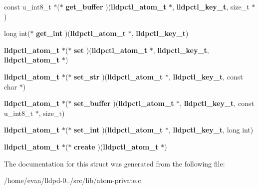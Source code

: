 \begin{DoxyCompactItemize}
\item 
const u\-\_\-int8\-\_\-t $\ast$($\ast$ {\bfseries get\-\_\-buffer} )({\bf lldpctl\-\_\-atom\-\_\-t} $\ast$, {\bf lldpctl\-\_\-key\-\_\-t}, size\-\_\-t $\ast$)\label{structatom__builder_ad81a05eb99677eeb9e5ac7226e34a9c6}

\item 
long int($\ast$ {\bfseries get\-\_\-int} )({\bf lldpctl\-\_\-atom\-\_\-t} $\ast$, {\bf lldpctl\-\_\-key\-\_\-t})\label{structatom__builder_a6daa5d14018b2226425d675867e40bd7}

\item 
{\bf lldpctl\-\_\-atom\-\_\-t} $\ast$($\ast$ {\bfseries set} )({\bf lldpctl\-\_\-atom\-\_\-t} $\ast$, {\bf lldpctl\-\_\-key\-\_\-t}, {\bf lldpctl\-\_\-atom\-\_\-t} $\ast$)\label{structatom__builder_afe734b0f5f76782c6236dc0fd895f515}

\item 
{\bf lldpctl\-\_\-atom\-\_\-t} $\ast$($\ast$ {\bfseries set\-\_\-str} )({\bf lldpctl\-\_\-atom\-\_\-t} $\ast$, {\bf lldpctl\-\_\-key\-\_\-t}, const char $\ast$)\label{structatom__builder_a6dd98361f1f4ea8433ee9b2d752db187}

\item 
{\bf lldpctl\-\_\-atom\-\_\-t} $\ast$($\ast$ {\bfseries set\-\_\-buffer} )({\bf lldpctl\-\_\-atom\-\_\-t} $\ast$, {\bf lldpctl\-\_\-key\-\_\-t}, const u\-\_\-int8\-\_\-t $\ast$, size\-\_\-t)\label{structatom__builder_adf5a98fbbae11849b14b253021d91abb}

\item 
{\bf lldpctl\-\_\-atom\-\_\-t} $\ast$($\ast$ {\bfseries set\-\_\-int} )({\bf lldpctl\-\_\-atom\-\_\-t} $\ast$, {\bf lldpctl\-\_\-key\-\_\-t}, long int)\label{structatom__builder_aed050470869bf0cf991e3d9f1be3be76}

\item 
{\bf lldpctl\-\_\-atom\-\_\-t} $\ast$($\ast$ {\bfseries create} )({\bf lldpctl\-\_\-atom\-\_\-t} $\ast$)\label{structatom__builder_aa92676b300c234435cce6ead72d89616}

\end{DoxyCompactItemize}


\-The documentation for this struct was generated from the following file\-:\begin{DoxyCompactItemize}
\item 
/home/evan/lldpd-\/0../src/lib/atom-\/private.\-c\end{DoxyCompactItemize}
